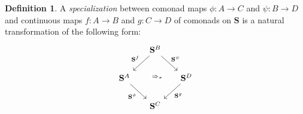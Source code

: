 \documentclass[11pt, oneside, article]{memoir}
\theoremstyle{plain}
\theoremstyle{definition}
\newtheorem{definition}[def]{Definition}
\theoremstyle{remark}
\newcommand{\cat}[1]{\mathbf{#1}}
\newcommand{\CoalgOn}[2]{{#2}^{#1}}
\newcommand{\CoalgS}[1]{\CoalgOn{#1}{\bS}}
\newcommand{\com}[2]{{#1}^{#2}}
\newcommand{\con}[2]{{#1}^{#2}}
\newcommand{\cmnd}[1]{{#1}}
\newcommand{\cA}{\cmnd{A}}
\newcommand{\cB}{\cmnd{B}}
\newcommand{\cC}{\cmnd{C}}
\newcommand{\cD}{\cmnd{D}}
\newcommand{\bS}{\cat{S}}
\newcommand{\AS}{\CoalgS{\cA}}
\newcommand{\BS}{\CoalgS{\cB}}
\newcommand{\CS}{\CoalgS{\cC}}
\newcommand{\DS}{\CoalgS{\cD}}
\begin{document}
\begin{definition}
  A \emph{specialization} between comonad maps
  $\phi \colon \cA \to \cC$ and $\psi \colon \cB \to \cD$ and continuous maps
  $f \colon \cA \to \cB$ and $g \colon \cC \to \cD$ of comonads
  on $\bS$ is a natural transformation of the following form:
  \[
    \begin{tikzcd}[column sep=15pt]
      & \BS & \\
      \AS && \DS \\
      & \CS
      \arrow["{\con{\bS}{f}}"', from=1-2, to=2-1]
      \arrow["{\com{\bS}{\psi}}", from=1-2, to=2-3]
      \arrow["{\Rightarrow_\sigma}"{description}, shift left, draw=none, from=1-2, to=3-2]
      \arrow["{\com{\bS}{\phi}}"', from=2-1, to=3-2]
      \arrow["{\con{\bS}{g}}", from=2-3, to=3-2]
    \end{tikzcd}
  \]
\end{definition}
\end{document}

